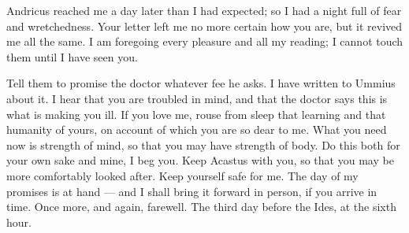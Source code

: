 

 Andricus reached me a day later than I had expected; so I had a night full of fear and wretchedness. Your letter left me no more certain how you are, but it revived me all the same. I am foregoing every pleasure and all my reading; I cannot touch them until I have seen you.

 Tell them to promise the doctor whatever fee he asks. I have written to Ummius about it. I hear that you are troubled in mind, and that the doctor says this is what is making you ill. If you love me, rouse from sleep that learning and that humanity of yours, on account of which you are so dear to me. What you need now is strength of mind, so that you may have strength of body. Do this both for your own sake and mine, I beg you. Keep Acastus with you, so that you may be more comfortably looked after. Keep yourself safe for me. The day of my promises is at hand --- and I shall bring it forward in person, if you arrive in time. Once more, and again, farewell. The third day before the Ides, at the sixth hour.
